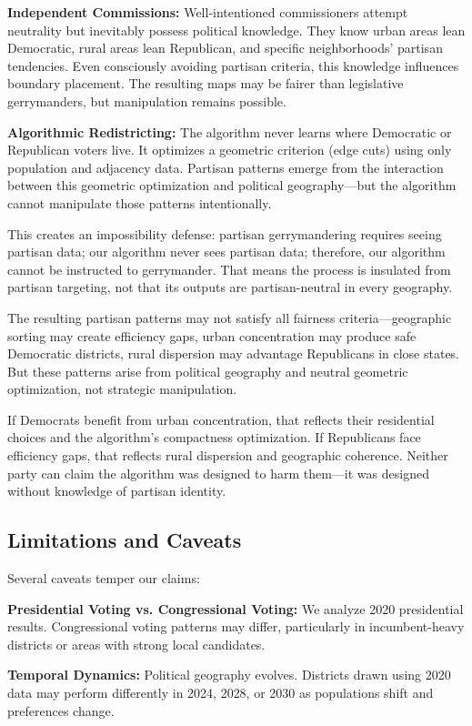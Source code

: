 \textbf{Independent Commissions:} Well-intentioned commissioners attempt neutrality but inevitably possess political knowledge. They know urban areas lean Democratic, rural areas lean Republican, and specific neighborhoods' partisan tendencies. Even consciously avoiding partisan criteria, this knowledge influences boundary placement. The resulting maps may be fairer than legislative gerrymanders, but manipulation remains possible.

\textbf{Algorithmic Redistricting:} The algorithm never learns where Democratic or Republican voters live. It optimizes a geometric criterion (edge cuts) using only population and adjacency data. Partisan patterns emerge from the interaction between this geometric optimization and political geography—but the algorithm cannot manipulate those patterns intentionally.

This creates an impossibility defense: partisan gerrymandering requires seeing partisan data; our algorithm never sees partisan data; therefore, our algorithm cannot be instructed to gerrymander. That means the process is insulated from partisan targeting, not that its outputs are partisan-neutral in every geography.

The resulting partisan patterns may not satisfy all fairness criteria—geographic sorting may create efficiency gaps, urban concentration may produce safe Democratic districts, rural dispersion may advantage Republicans in close states. But these patterns arise from political geography and neutral geometric optimization, not strategic manipulation.

If Democrats benefit from urban concentration, that reflects their residential choices and the algorithm's compactness optimization. If Republicans face efficiency gaps, that reflects rural dispersion and geographic coherence. Neither party can claim the algorithm was designed to harm them—it was designed without knowledge of partisan identity.

\subsection{Limitations and Caveats}

Several caveats temper our claims:

\textbf{Presidential Voting vs. Congressional Voting:} We analyze 2020 presidential results. Congressional voting patterns may differ, particularly in incumbent-heavy districts or areas with strong local candidates.

\textbf{Temporal Dynamics:} Political geography evolves. Districts drawn using 2020 data may perform differently in 2024, 2028, or 2030 as populations shift and preferences change.

